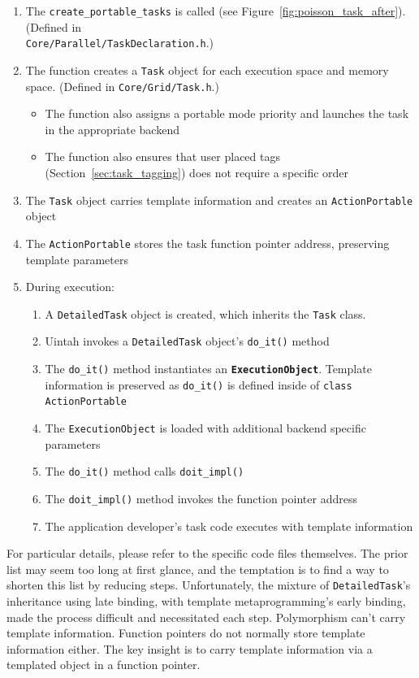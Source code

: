 \documentclass[]{article}
\begin{document}
\begin{enumerate}
	\item{The \texttt{create\_portable\_tasks} is called (see Figure~\ref{fig:poisson_task_after}).   (Defined in \\ \texttt{Core/Parallel/TaskDeclaration.h}.)}  
	\item{The function creates a \texttt{Task} object for each execution space and memory space. (Defined in \texttt{Core/Grid/Task.h}.)}
	\begin{itemize}
		\item{The function also assigns a portable mode priority and launches the task in the appropriate backend}
		\item{The function also ensures that user placed tags (Section~\ref{sec:task_tagging}) does not require a specific order}
    \end{itemize}
    \item{The \texttt{Task} object carries template information and creates an \texttt{ActionPortable} object}
    \item{The \texttt{ActionPortable} stores the task function pointer address, preserving template parameters}
    \item{During execution:}
    \begin{enumerate} 
    	\item{A \texttt{DetailedTask} object is created, which inherits the \texttt{Task} class.}
    	\item{Uintah invokes a \texttt{DetailedTask} object's \texttt{do\_it()} method}
    	\item{The \texttt{do\_it()} method instantiates an \textbf{\texttt{ExecutionObject}}.  Template information is preserved as \texttt{do\_it()} is defined inside of \texttt{class ActionPortable}}
    	\item{The \texttt{ExecutionObject} is loaded with additional backend specific parameters}
    	\item{The \texttt{do\_it()} method calls \texttt{doit\_impl()}}
    	\item{The \texttt{doit\_impl()} method invokes the function pointer address}
    	\item{The application developer's task code executes with template information}
    \end{enumerate}
\end{enumerate}

For particular details, please refer to the specific code files themselves.  The prior list may seem too long at first glance, and the temptation is to find a way to shorten this list by reducing steps.  Unfortunately, the mixture of \texttt{DetailedTask}'s inheritance using late binding, with template metaprogramming's early binding, made the process difficult and necessitated each step.  Polymorphism can't carry template information.  Function pointers do not normally store template information either.  The key insight is to carry template information via a templated object in a function pointer.  
\end{document}
